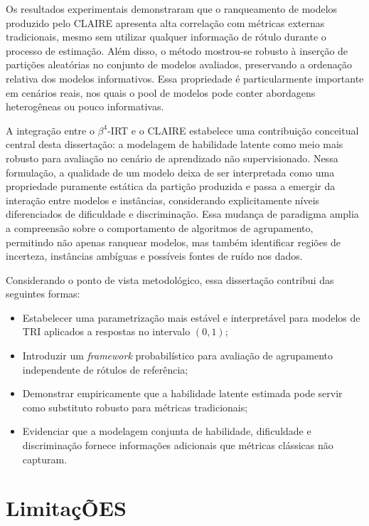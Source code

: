 Os resultados experimentais demonstraram que o ranqueamento de modelos produzido pelo \gls{CLAIRE} apresenta alta correlação com métricas externas tradicionais, mesmo sem utilizar qualquer informação de rótulo durante o processo de estimação. Além disso, o método mostrou-se robusto à inserção de partições aleatórias no conjunto de modelos avaliados, preservando a ordenação relativa dos modelos informativos. Essa propriedade é particularmente importante em cenários reais, nos quais o pool de modelos pode conter abordagens heterogêneas ou pouco informativas.

A integração entre o $\beta^{4}$-\gls{IRT} e o \gls{CLAIRE} estabelece uma contribuição conceitual central desta dissertação: a modelagem de habilidade latente como meio mais robusto para avaliação no cenário de aprendizado não supervisionado. Nessa formulação, a qualidade de um modelo deixa de ser interpretada como uma propriedade puramente estática da partição produzida e passa a emergir da interação entre modelos e instâncias, considerando explicitamente níveis diferenciados de dificuldade e discriminação. Essa mudança de paradigma amplia a compreensão sobre o comportamento de algoritmos de agrupamento, permitindo não apenas ranquear modelos, mas também identificar regiões de incerteza, instâncias ambíguas e possíveis fontes de ruído nos dados.

Considerando o ponto de vista metodológico, essa dissertação contribui das seguintes formas:

\begin{itemize}
    \item Estabelecer uma parametrização mais estável e interpretável para modelos de TRI aplicados a respostas no intervalo $(0, 1)$;
    \item Introduzir um \textit{framework} probabilístico para avaliação de agrupamento independente de rótulos de referência;
    \item Demonstrar empiricamente que a habilidade latente estimada pode servir como substituto robusto para métricas tradicionais;
    \item Evidenciar que a modelagem conjunta de habilidade, dificuldade e discriminação fornece informações adicionais que métricas clássicas não capturam.
\end{itemize}

\section{LimitaçÕES}

